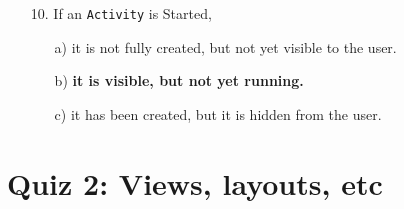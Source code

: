 \documentclass[12pt]{book}
\begin{document}
\begin{itemize}
    \item[10.] If an \texttt{Activity} is Started,
    \begin{itemize}
        \item[a)] it is not fully created, but not yet visible to the user.
        \item[b)] \textbf{it is visible, but not yet running.}
        \item[c)] it has been created, but it is hidden from the user.
    \end{itemize}

\end{itemize}

\section*{Quiz 2: Views, layouts, etc}
\end{document}
